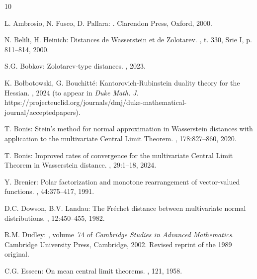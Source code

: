 \documentclass[11pt,reqno]{amsart}
\theoremstyle{definition}
\numberwithin{equation}{section}
\begin{document}


\begin{thebibliography}{10}

	L. Ambrosio, N. Fusco, D. Pallara: 
	.
	\newblock Clarendon Press, Oxford, 2000.


N. Belili, H. Heinich:
\newblock Distances de Wasserstein et de Zolotarev.
, t. 330, Srie I, p. 811–814, 2000.

S.G. Bobkov:
\newblock Zolotarev-type distances.
, 2023.

K. Bo{\l}botowski, G. Bouchitt{\'e}:
\newblock Kantorovich-Rubinstein duality theory for the Hessian.
, 2024 (to appear in \textit{Duke Math. J.}
https://projecteuclid.org/journals/dmj/duke-mathematical-journal/acceptedpapers).

T. Bonis:
\newblock Stein’s method for normal approximation in Wasserstein distances
  with application to the multivariate Central Limit Theorem.
, 178:827--860, 2020.

T. Bonis:
\newblock Improved rates of convergence for the multivariate Central Limit
  Theorem in Wasserstein distance.
, 29:1--18, 2024.

Y. Brenier:
\newblock Polar factorization and monotone rearrangement of vector-valued
  functions.
, 44:375--417,
  1991.

D.C. Dowson, B.V. Landau:
\newblock The Fr{\'e}chet distance between multivariate normal distributions.
, 12:450--455, 1982.

R.M. Dudley:
, volume~74 of {\em Cambridge
  Studies in Advanced Mathematics}.
\newblock Cambridge University Press, Cambridge, 2002.
\newblock Revised reprint of the 1989 original.

C.G. Esseen:
\newblock On mean central limit theorems. 
, 121, 1958.



\end{thebibliography}
\end{document}
